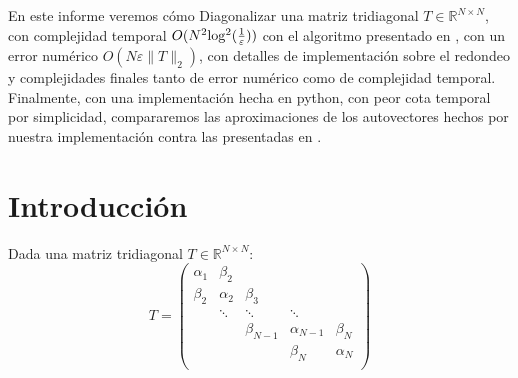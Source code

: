 \documentclass[11pt,a4paper]{article}
\newcommand{\R}{\mathbb{R}}
\begin{document}
\begin{calloutbox}
    En este informe veremos cómo Diagonalizar una matriz tridiagonal $T \in \R^{N \times N}$, con complejidad temporal $O(N^2\rm{log^2}(\frac1\varepsilon))$ con el algoritmo presentado en \cite{gu1995}, con un error numérico $O(N \varepsilon \| T\|_2 )$, con detalles de implementación sobre el redondeo y complejidades finales tanto de error numérico como de complejidad temporal.\\
    
    Finalmente, con una implementación hecha en python, con peor cota temporal por simplicidad, compararemos las aproximaciones de los autovectores hechos por nuestra implementación contra las presentadas en \cite{gu1995}.



    \vspace{0.4em}
\end{calloutbox}

\vspace{0.5cm}
\tableofcontents

\clearpage
{} %


\section{Introducción}
Dada una matriz tridiagonal $T\in \R^{N\times N}:$\\

$$T=\begin{pmatrix}
    \alpha_1 & \beta_2 &  &  &  \\
    \beta_2 & \alpha_2 & \beta_3 & & \\
     & \ddots & \ddots & \ddots &  \\
     & & \beta_{N-1} & \alpha_{N-1} & \beta_N \\
     & & & \beta_N & \alpha_N \\
\end{pmatrix}$$
\end{document}
